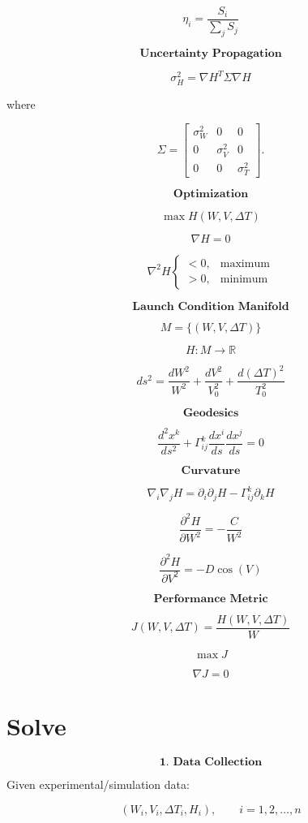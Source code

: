 \documentclass{article}
\begin{document}
\[
\eta_i=
\frac{S_i}{\sum_jS_j}
\]

\[
\textbf{Uncertainty Propagation}
\]

\[
\sigma_H^2
=
\nabla H^T
\Sigma
\nabla H
\]

where

\[
\Sigma=
\begin{bmatrix}
\sigma_W^2&0&0\\
0&\sigma_V^2&0\\
0&0&\sigma_T^2
\end{bmatrix}.
\]

\[
\textbf{Optimization}
\]

\[
\max H(W,V,\Delta T)
\]

\[
\nabla H=0
\]

\[
\nabla^2H
\begin{cases}
<0,&\text{maximum}\\
>0,&\text{minimum}
\end{cases}
\]

\[
\textbf{Launch Condition Manifold}
\]

\[
M=\{(W,V,\Delta T)\}
\]

\[
H:M\rightarrow\mathbb{R}
\]

\[
ds^2
=
\frac{dW^2}{W^2}
+
\frac{dV^2}{V_0^2}
+
\frac{d(\Delta T)^2}{T_0^2}
\]

\[
\textbf{Geodesics}
\]

\[
\frac{d^2x^k}{ds^2}
+
\Gamma^k_{ij}
\frac{dx^i}{ds}
\frac{dx^j}{ds}
=0
\]

\[
\textbf{Curvature}
\]

\[
\nabla_i\nabla_jH
=
\partial_i\partial_jH
-
\Gamma^k_{ij}\partial_kH
\]

\[
\frac{\partial^2H}{\partial W^2}
=
-\frac{C}{W^2}
\]

\[
\frac{\partial^2H}{\partial V^2}
=
-D\cos(V)
\]

\[
\textbf{Performance Metric}
\]

\[
J(W,V,\Delta T)
=
\frac{H(W,V,\Delta T)}{W}
\]

\[
\max J
\]

\[
\nabla J=0
\]

\section*{Solve}

\[
\textbf{1. Data Collection}
\]

Given experimental/simulation data:

\[
(W_i,V_i,\Delta T_i,H_i),
\qquad i=1,2,\dots,n
\]
\end{document}
